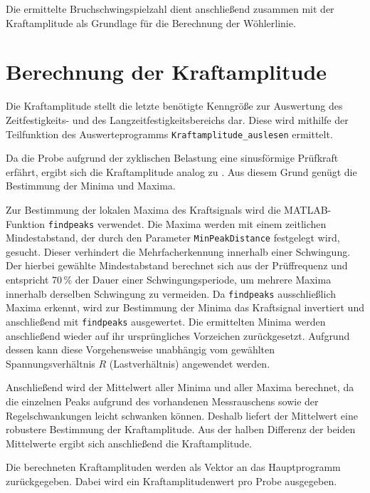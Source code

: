 	Die ermittelte Bruchschwingspielzahl dient anschließend zusammen mit der Kraftamplitude als Grundlage für die Berechnung der Wöhlerlinie.

	\section{Berechnung der Kraftamplitude}
	Die Kraftamplitude stellt die letzte benötigte Kenngröße zur Auswertung des Zeitfestigkeits- und des Langzeitfestigkeitsbereichs dar. Diese wird mithilfe der Teilfunktion des Auswerteprogramms \texttt{Kraftamplitude\_auslesen} ermittelt. 
	
	Da die Probe aufgrund der zyklischen Belastung eine sinusförmige Prüfkraft erfährt, ergibt sich die Kraftamplitude analog zu . Aus diesem Grund genügt die Bestimmung der Minima und Maxima. 
	
	Zur Bestimmung der lokalen Maxima des Kraftsignals wird die MATLAB-Funktion \texttt{findpeaks} verwendet. Die Maxima werden mit einem zeitlichen Mindestabstand, der durch den Parameter \texttt{MinPeakDistance} festgelegt wird, gesucht. Dieser verhindert die Mehrfacherkennung innerhalb einer Schwingung. Der hierbei gewählte Mindestabstand berechnet sich aus der Prüffrequenz und entspricht 70\,\% der Dauer einer Schwingungsperiode, um mehrere Maxima innerhalb derselben Schwingung zu vermeiden. Da \texttt{findpeaks} ausschließlich Maxima erkennt, wird zur Bestimmung der Minima das Kraftsignal invertiert und anschließend mit \texttt{findpeaks} ausgewertet. Die ermittelten Minima werden anschließend wieder auf ihr ursprüngliches Vorzeichen zurückgesetzt. Aufgrund dessen kann diese Vorgehensweise unabhängig vom gewählten Spannungsverhältnis $R$ (Lastverhältnis) angewendet werden. 
	
	Anschließend wird der Mittelwert aller Minima und aller Maxima berechnet, da die einzelnen Peaks aufgrund des vorhandenen Messrauschens sowie der Regelschwankungen leicht schwanken können. Deshalb liefert der Mittelwert eine robustere Bestimmung der Kraftamplitude.
	Aus der halben Differenz der beiden Mittelwerte ergibt sich anschließend die Kraftamplitude. 
	
	Die berechneten Kraftamplituden werden als Vektor an das Hauptprogramm zurückgegeben. Dabei wird ein Kraftamplitudenwert pro Probe ausgegeben. 
	
